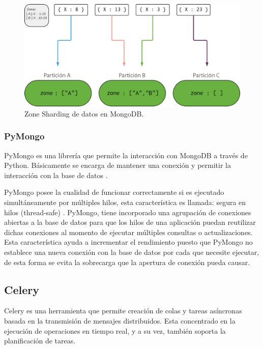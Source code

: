 \begin{itemize}
\begin{figure}[H]
	\centering
		\includegraphics[width=.9\textwidth]{figures/zone_sharding}
	\caption{Zone Sharding de datos en MongoDB.}
	\label{fig:zone_sharding}
\end{figure}

\end{itemize}

\subsubsection{PyMongo}

PyMongo es una librería que permite la interacción con MongoDB a través de Python.
Básicamente se encarga de mantener una conexión y permitir la interacción con la base
de datos \cite{17}.

PyMongo posee la cualidad de funcionar correctamente si es ejecutado
simultáneamente por múltiples hilos, esta característica es llamada: segura en hilos
(thread-safe) \cite{18}. PyMongo, tiene incorporado una agrupación de conexiones abiertas a
la base de datos para que los hilos de una aplicación puedan reutilizar dichas
conexiones al momento de ejecutar múltiples consultas o actualizaciones. Esta
característica ayuda a incrementar el rendimiento puesto que PyMongo no establece
una nueva conexión con la base de datos por cada que necesite ejecutar, de esta forma
se evita la sobrecarga que la apertura de conexión pueda causar.

\subsection{Celery}

Celery es una herramienta que permite creación de colas y tareas asíncronas basada en la transmisión de mensajes distribuidos.
Esta concentrado en la ejecución de operaciones en tiempo real, y a su vez, también soporta la planificación de tareas.

